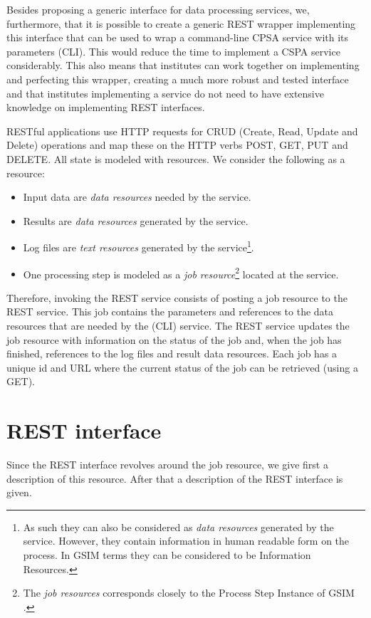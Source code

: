 \documentclass[a4paper]{article}
\begin{document}
Besides proposing a generic interface for data processing services, we,
furthermore, that it is possible to create a generic REST wrapper implementing
this interface that can be used to wrap a command-line CPSA service with its
parameters (CLI). This would reduce the time to implement a CSPA service
considerably.  This also means that institutes can work together on implementing
and perfecting this wrapper, creating a much more robust and tested interface
and that institutes implementing a service do not need to have extensive
knowledge on implementing REST interfaces. 

RESTful applications use HTTP requests for CRUD (Create, Read, Update and
Delete) operations and map these on the HTTP verbs POST, GET, PUT and DELETE.
All state is modeled with resources. We consider the following as a resource:

\begin{itemize}
  \item Input data are \emph{data resources} needed by the service.
  \item Results are \emph{data resources} generated by the service.
  \item Log files are \emph{text resources} generated by the service\footnote{As
  such they can also be considered as \emph{data resources} generated by the
  service. However, they contain information in human readable form on the
  process. In GSIM \citep{gsim2013} terms they can be considered to be
  Information Resources.}.
  \item One processing step is modeled as a \emph{job resource}\footnote{The
  \emph{job resources} corresponds closely to the Process Step Instance of GSIM
  \citep{gsim2013}.} located at the service.
\end{itemize}

Therefore, invoking the REST service consists of posting a job resource to the
REST service. This job contains the parameters and references to the data
resources that are needed by the (CLI) service.  The REST service updates the
job resource with information on the status of the job and, when the job has
finished, references to the log files and result data resources. Each job has a
unique id and URL where the current status of the job can be retrieved (using a
GET). 

\section{REST interface}
Since the REST interface revolves around the job resource, we give first a
description of this resource. After that a description of the REST interface is
given. 
\end{document}
